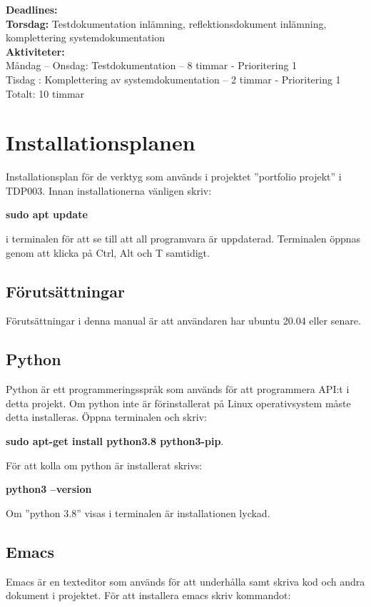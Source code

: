 \documentclass{TDP003mall}
\begin{document}
\textbf{Deadlines:} \\
\textbf{{\color{red}Torsdag:}} Testdokumentation inlämning, reflektionsdokument inlämning, komplettering systemdokumentation\\

\textbf{Aktiviteter:} \\
Måndag – Onsdag: Testdokumentation – 8 timmar - Prioritering 1\\
Tisdag : Komplettering av systemdokumentation  – 2 timmar - Prioritering 1\\

Totalt: 10 timmar


\section{Installationsplanen}
Installationsplan för de verktyg som används i projektet ''portfolio projekt'' i TDP003. Innan installationerna vänligen skriv:

\textbf{sudo apt update}

i terminalen för att se till att all programvara är uppdaterad. Terminalen öppnas genom att klicka på Ctrl, Alt och T samtidigt.

\subsection{Förutsättningar}
Förutsättningar i denna manual är att användaren har ubuntu 20.04 eller senare.

\subsection{Python}
Python är ett programmeringsspråk som används för att programmera API:t i detta projekt.
Om python inte är förinstallerat på Linux operativsystem måste detta installeras. Öppna terminalen och skriv:

\textbf{sudo apt-get install python3.8 python3-pip}.

För att kolla om python är installerat skrivs:

\textbf{python3 --version}

Om ''python 3.8'' visas i terminalen är installationen lyckad.

\subsection{Emacs}
Emacs är en texteditor som används för att underhålla samt skriva kod och andra dokument i projektet.
För att installera emacs skriv kommandot:
\end{document}
